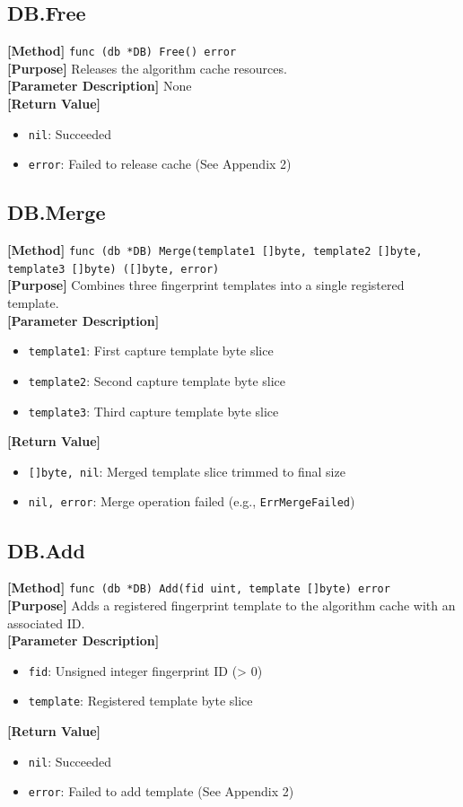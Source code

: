 \documentclass[11pt, a4paper]{article}
\begin{document}
\subsection{DB.Free}
\textbf{[Method]} \texttt{func (db *DB) Free() error} \\
\textbf{[Purpose]} Releases the algorithm cache resources. \\
\textbf{[Parameter Description]} None \\
\textbf{[Return Value]} 
\begin{itemize}
    \item \texttt{nil}: Succeeded
    \item \texttt{error}: Failed to release cache (See Appendix 2)
\end{itemize}

\subsection{DB.Merge}
\textbf{[Method]} \texttt{func (db *DB) Merge(template1 []byte, template2 []byte, template3 []byte) ([]byte, error)} \\
\textbf{[Purpose]} Combines three fingerprint templates into a single registered template. \\
\textbf{[Parameter Description]} 
\begin{itemize}
    \item \texttt{template1}: First capture template byte slice
    \item \texttt{template2}: Second capture template byte slice
    \item \texttt{template3}: Third capture template byte slice
\end{itemize}
\textbf{[Return Value]} 
\begin{itemize}
    \item \texttt{[]byte, nil}: Merged template slice trimmed to final size
    \item \texttt{nil, error}: Merge operation failed (e.g., \texttt{ErrMergeFailed})
\end{itemize}

\subsection{DB.Add}
\textbf{[Method]} \texttt{func (db *DB) Add(fid uint, template []byte) error} \\
\textbf{[Purpose]} Adds a registered fingerprint template to the algorithm cache with an associated ID. \\
\textbf{[Parameter Description]} 
\begin{itemize}
    \item \texttt{fid}: Unsigned integer fingerprint ID (> 0)
    \item \texttt{template}: Registered template byte slice
\end{itemize}
\textbf{[Return Value]} 
\begin{itemize}
    \item \texttt{nil}: Succeeded
    \item \texttt{error}: Failed to add template (See Appendix 2)
\end{itemize}
\end{document}
